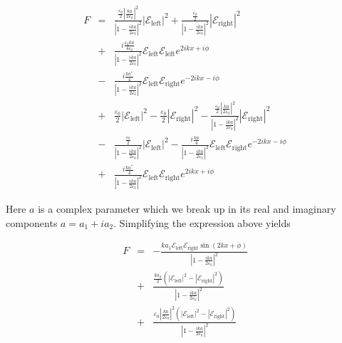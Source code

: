 \documentclass[twocolumn,english,pra,aps,superscriptaddress,floatfix]{revtex4-1}
\begin{document}
\begin{eqnarray}
F&=&\frac{\frac{\varepsilon_{0}}{2}\left|\frac{k a}{2\varepsilon_{0}}\right|^{2}}{\left|1-\frac{ika}{2\varepsilon_{0}}\right|^{2}}\left|\mathcal{E}_{\mathrm{left}}\right|^{2}+\frac{\frac{\varepsilon_{0}}{2}}{\left|1-\frac{ika}{2\varepsilon_{0}}\right|^{2}}\left|\mathcal{E}_{\mathrm{right}}\right|^{2} \nonumber \\
&+&\frac{i\frac{\varepsilon_{0}ka}{4\varepsilon_{0}}}{\left|1-\frac{ika}{2\varepsilon_{0}}\right|^{2}}\mathcal{E}_{\mathrm{left}}\mathcal{E}_{\mathrm{left}}e^{2ikx+i\phi}\nonumber \\
&-&\frac{i\frac{ka^{*}}{4}}{\left|1-\frac{ika}{2\varepsilon_{0}}\right|^{2}}\mathcal{E}_{\mathrm{left}}\mathcal{E}_{\mathrm{right}}e^{-2ikx-i\phi} \nonumber \\
&+&\frac{\varepsilon_{0}}{2}\left|\mathcal{E}_{\mathrm{left}}\right|^{2}-\frac{\varepsilon_{0}}{2}\left|\mathcal{E}_{\mathrm{right}}\right|^{2}-\frac{\frac{\varepsilon_{0}}{2}\left|\frac{ka}{2\varepsilon_{0}}\right|^{2}}{\left|1-\frac{ika}{2\varepsilon_{0}}\right|^{2}}\left|\mathcal{E}_{\mathrm{right}}\right|^{2} \nonumber \\
&-&\frac{\frac{\varepsilon_{0}}{2}}{\left|1-\frac{ika}{2\varepsilon_{0}}\right|^{2}}\left|\mathcal{E}_{\mathrm{left}}\right|^{2}-\frac{i\frac{ka}{4}}{\left|1-\frac{ika}{2\varepsilon_{0}}\right|^{2}}\mathcal{E}_{\mathrm{left}}\mathcal{E}_{\mathrm{right}}e^{-2ikx-i\phi} \nonumber \\
&+&\frac{i\frac{ka^{*}}{4}}{\left|1-\frac{ika}{2\varepsilon_{0}}\right|^{2}}\mathcal{E}_{\mathrm{left}}\mathcal{E}_{\mathrm{right}}e^{2ikx+i\phi}
\label{f1}
\end{eqnarray}

Here $a$ is a complex parameter which we break up in its real and imaginary components $a=a_{1}+ia_{2}$. Simplifying the expression above yields

\begin{eqnarray}
F &=&-\frac{ka_{1}\mathcal{E}_{\mathrm{left}}\mathcal{E}_{\mathrm{right}}\sin\left(2kx+\phi\right)}{\left|1-\frac{ika}{2\varepsilon_{0}}\right|^{2}} \nonumber \\
&+&\frac{\frac{ka_{2}}{2}\left(\left|\mathcal{E}_{\mathrm{left}}\right|^{2}-\left|\mathcal{E}_{\mathrm{right}}\right|^{2}\right)}{\left|1-\frac{ika}{2\varepsilon_{0}}\right|^{2}} \nonumber \\
&+&\frac{\varepsilon_{0}\left|\frac{ka}{2\varepsilon_{0}}\right|^{2}\left(\left|\mathcal{E}_{\mathrm{left}}\right|^{2}-\left|\mathcal{E}_{\mathrm{right}}\right|^{2}\right)}{\left|1-\frac{ika}{2\varepsilon_{0}}\right|^{2}}
\label{f2}
\end{eqnarray}
\end{document}
